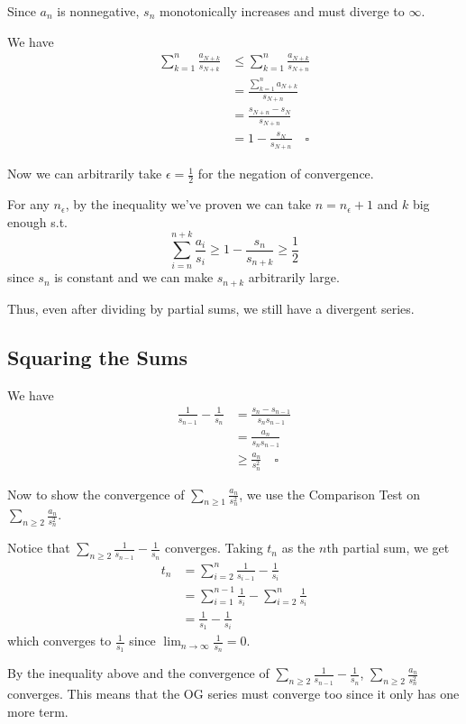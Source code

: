 \documentclass[12pt]{article}
\begin{document}
Since $a_n$ is nonnegative, $s_n$ monotonically increases and must diverge to $\infty$.

We have
\begin{align*}
  \sum_{k=1}^{n} \frac{a_{N+k}}{s_{N+k}}
   & \le \sum_{k=1}^{n} \frac{a_{N+k}}{s_{N+n}} \\
   & = \frac{\sum_{k=1}^{n} a_{N+k}}{s_{N+n}}   \\
   & = \frac{s_{N+n} - s_N}{s_{N+n}}            \\
   & = 1-\frac{s_N}{s_{N+n}}\quad\square
\end{align*}

Now we can arbitrarily take $\epsilon=\frac{1}{2}$ for the negation of convergence.

For any $n_\epsilon$, by the inequality we've proven we
can take $n=n_\epsilon+1$ and $k$ big enough s.t.
\[\sum_{i=n}^{n+k} \frac{a_i}{s_i} \ge 1-\frac{s_n}{s_{n+k}} \ge \frac{1}{2}\]
since $s_n$ is constant and we can make $s_{n+k}$ arbitrarily large.

Thus, even after dividing by partial sums, we still have a divergent series.

\subsection{Squaring the Sums}

We have
\begin{align*}
  \frac{1}{s_{n-1}} - \frac{1}{s_n}
   & = \frac{s_n-s_{n-1}}{s_ns_{n-1}}  \\
   & = \frac{a_n}{s_ns_{n-1}}          \\
   & \ge \frac{a_n}{s_n^2}\quad\square
\end{align*}

Now to show the convergence of $\sum_{n \ge 1} \frac{a_n}{s_n^2}$, we use the Comparison Test on $\sum_{n \ge 2} \frac{a_n}{s_n^2}$.

Notice that $\sum_{n \ge 2} \frac{1}{s_{n-1}}-\frac{1}{s_n}$ converges.
Taking $t_n$ as the $n$th partial sum, we get
\begin{align*}
  t_n
   & =\sum_{i=2}^{n} \frac{1}{s_{i-1}}-\frac{1}{s_i}                \\
   & =\sum_{i=1}^{n-1} \frac{1}{s_i} - \sum_{i=2}^{n} \frac{1}{s_i} \\
   & =\frac{1}{s_1} - \frac{1}{s_i}
\end{align*}
which converges to $\frac{1}{s_1}$ since $\lim_{n \to \infty} \frac{1}{s_n}=0$.

By the inequality above and the convergence of $\sum_{n \ge 2} \frac{1}{s_{n-1}}-\frac{1}{s_n}$,
$\sum_{n \ge 2} \frac{a_n}{s_n^2}$ converges.
This means that the OG series must converge too since it only has one more term.
\end{document}
